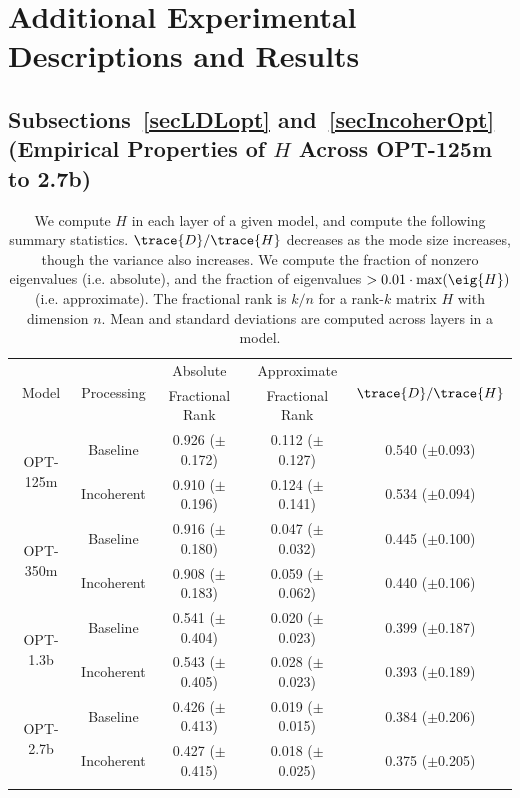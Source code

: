 \section{Additional Experimental Descriptions and Results}\label{suppAddResults}
\subsection{Subsections~\ref{secLDLopt} and~\ref{secIncoherOpt} (Empirical Properties of $H$ Across OPT-125m to 2.7b)}
\begin{table}[t]
\centering
\begin{tabular}{cc|ccc}
\multirow{2}{*}{Model}\Bstrut & 
\multirow{2}{*}{Processing} & 
Absolute & Approximate &
\multirow{2}{*}{$\trace{D} / \trace{H}$} \\
& & Fractional Rank & Fractional Rank & \\
\hline
\multirow{2}{*}{OPT-125m}\Tstrut & Baseline & 
0.926 ($\pm$0.172) &
0.112 ($\pm$0.127) &
0.540 ($\pm$0.093) \\
& Incoherent\Bstrut & 
0.910 ($\pm$0.196) &
0.124 ($\pm$0.141) &
0.534 ($\pm$0.094) \\
\multirow{2}{*}{OPT-350m} & Baseline\Tstrut &
0.916 ($\pm$0.180) &
0.047 ($\pm$0.032) &
0.445 ($\pm$0.100) \\
& Incoherent\Bstrut &
0.908 ($\pm$0.183) &
0.059 ($\pm$0.062) &
0.440 ($\pm$0.106) \\
\multirow{2}{*}{OPT-1.3b} & Baseline\Tstrut &
0.541 ($\pm$0.404) &
0.020 ($\pm$0.023) &
0.399 ($\pm$0.187) \\
& Incoherent\Bstrut &
0.543 ($\pm$0.405) &
0.028 ($\pm$0.023) &
0.393 ($\pm$0.189) \\
\multirow{2}{*}{OPT-2.7b} & Baseline\Tstrut &
0.426 ($\pm$0.413) &
0.019 ($\pm$0.015) &
0.384 ($\pm$0.206) \\
& Incoherent\Bstrut &
0.427 ($\pm$0.415) &
0.018 ($\pm$0.025) &
0.375 ($\pm$0.205) \\
\Bstrut
\end{tabular}
\caption{
We compute $H$ in each layer of a given model, and compute the following summary statistics.
%
$\trace{D}/\trace{H}$ decreases as the mode size increases, though the variance also increases.
We compute the fraction of nonzero eigenvalues (i.e. absolute), and the fraction of eigenvalues $> 0.01 \cdot \max(\eig{H})$ (i.e. approximate).
The fractional rank is $k / n$ for a rank-$k$ matrix $H$ with dimension $n$.
Mean and standard deviations are computed across layers in a model.
}
\label{tabsuppHSummary}
\end{table}

